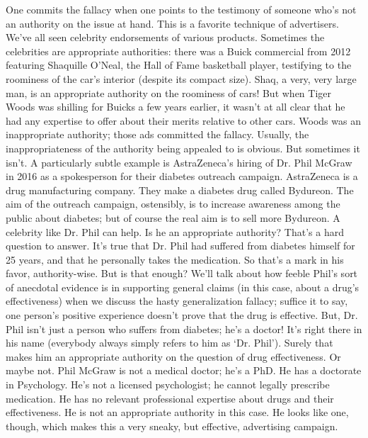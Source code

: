 One commits the fallacy when one points to the testimony of someone who’s not an authority on
the issue at hand. This is a favorite technique of advertisers. We’ve all seen celebrity endorsements
of various products. Sometimes the celebrities are appropriate authorities: there was a Buick
commercial from 2012 featuring Shaquille O’Neal, the Hall of Fame basketball player, testifying
to the roominess of the car’s interior (despite its compact size). Shaq, a very, very large man, is an
appropriate authority on the roominess of cars! But when Tiger Woods was shilling for Buicks a
few years earlier, it wasn’t at all clear that he had any expertise to offer about their merits relative
to other cars. Woods was an inappropriate authority; those ads committed the fallacy.
Usually, the inappropriateness of the authority being appealed to is obvious. But sometimes it isn’t.
A particularly subtle example is AstraZeneca’s hiring of Dr. Phil McGraw in 2016 as a
spokesperson for their diabetes outreach campaign. AstraZeneca is a drug manufacturing
company. They make a diabetes drug called Bydureon. The aim of the outreach campaign,
ostensibly, is to increase awareness among the public about diabetes; but of course the real aim is
to sell more Bydureon. A celebrity like Dr. Phil can help. Is he an appropriate authority? That’s a
hard question to answer. It’s true that Dr. Phil had suffered from diabetes himself for 25 years, and
that he personally takes the medication. So that’s a mark in his favor, authority-wise. But is that
enough? We’ll talk about how feeble Phil’s sort of anecdotal evidence is in supporting general
claims (in this case, about a drug’s effectiveness) when we discuss the hasty generalization fallacy;
suffice it to say, one person’s positive experience doesn’t prove that the drug is effective. But, Dr.
Phil isn’t just a person who suffers from diabetes; he’s a doctor! It’s right there in his name
(everybody always simply refers to him as ‘Dr. Phil’). Surely that makes him an appropriate
authority on the question of drug effectiveness. Or maybe not. Phil McGraw is not a medical
doctor; he’s a PhD. He has a doctorate in Psychology. He’s not a licensed psychologist; he cannot
legally prescribe medication. He has no relevant professional expertise about drugs and their
effectiveness. He is not an appropriate authority in this case. He looks like one, though, which
makes this a very sneaky, but effective, advertising campaign.

